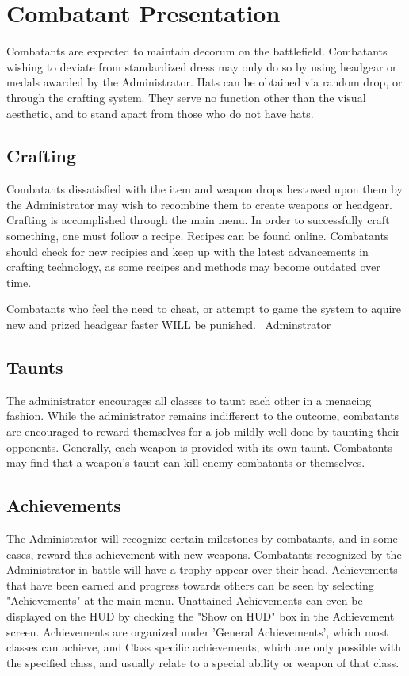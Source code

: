 \section{Combatant Presentation}
Combatants are expected to maintain decorum on the battlefield.  Combatants wishing to deviate from standardized dress may only do so by using headgear or medals awarded by the Administrator. Hats can be obtained via random drop, or through the crafting system. They serve no function other than the visual aesthetic, and to stand apart from those who do not have hats.

\subsection{Crafting}
Combatants dissatisfied with the item and weapon drops bestowed upon them by the Administrator may wish to recombine them to create weapons or headgear.  Crafting is accomplished through the main menu.  In order to successfully craft something, one must follow a recipe.  Recipes can be found online. Combatants should check for new recipies and keep up with the latest advancements in crafting technology, as some recipes and methods may become outdated over time. 

Combatants who feel the need to cheat, or attempt to game the system to aquire new and prized headgear faster WILL be punished. ~Adminstrator

\subsection{Taunts}
The administrator encourages all classes to taunt each other in a menacing fashion. While the administrator remains indifferent to the outcome, combatants are encouraged to reward themselves for a job mildly well done by taunting their opponents. Generally, each weapon is provided with its own taunt. Combatants may find that a weapon's taunt can kill enemy combatants or themselves.
 
\subsection{Achievements}
The Administrator will recognize certain milestones by combatants, and in some cases, reward this achievement with new weapons. Combatants recognized by the Administrator in battle will have a trophy appear over their head. Achievements that have been earned and progress towards others can be seen by selecting "Achievements" at the main menu. Unattained Achievements can even be displayed on the HUD by checking the "Show on HUD" box in the Achievement screen.  Achievements are organized under 'General Achievements', which most classes can achieve, and Class specific achievements, which are only possible with the specified class, and usually relate to a special ability or weapon of that class.
